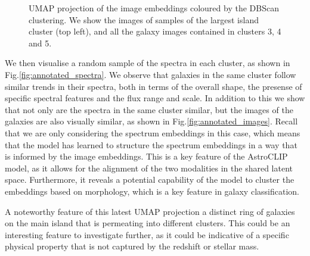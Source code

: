 \documentclass[a4paper,12pt]{article}
\begin{document}
\begin{figure}[H]
    \centering
    \caption{UMAP projection of the image embeddings coloured by the DBScan clustering. We show the images of samples of the largest island cluster (top left), and all the galaxy images contained in clusters 3, 4 and 5.}
    \label{fig:umap_DBSCAN}
\end{figure}


We then visualise a random sample of the spectra in each cluster, as shown in Fig.\ref{fig:annotated_spectra}. We observe that galaxies in the same cluster follow similar trends in their spectra, both in terms of the overall shape, the presense of specific spectral features and the flux range and scale. In addition to this we show that not only are the spectra in the same cluster similar, but the images of the galaxies are also visually similar, as shown in Fig.\ref{fig:annotated_images}. Recall that we are only considering the spectrum embeddings in this case, which means that the model has learned to structure the spectrum embeddings in a way that is informed by the image embeddings. This is a key feature of the AstroCLIP model, as it allows for the alignment of the two modalities in the shared latent space. Furthermore, it reveals a potential capability of the model to cluster the embeddings based on morphology, which is a key feature in galaxy classification. 

A noteworthy feature of this latest UMAP projection a distinct ring of galaxies on the main island that is permeating into different clusters. This could be an interesting feature to investigate further, as it could be indicative of a specific physical property that is not captured by the redshift or stellar mass.
\end{document}
